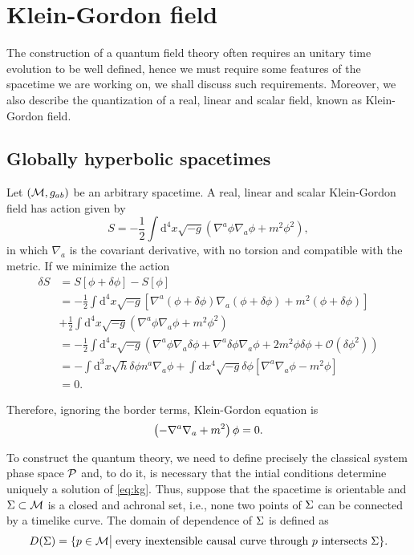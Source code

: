 \chapter{Klein-Gordon field}
\pagestyle{fancy}

The construction of a quantum field theory often requires an unitary time evolution to be well defined, hence we must require some features of the spacetime we are working on, we shall discuss such requirements. Moreover, we also describe the quantization of a real, linear and scalar field, known as Klein-Gordon field.

\section{Globally hyperbolic spacetimes}
Let \(({\mathcal{M}}, g_{ab})\) be an arbitrary spacetime. A real, linear and scalar Klein-Gordon field has action given by
\begin{equation}
    S=-\frac{1}{2}\int\mathrm{d}^4x\sqrt{-g}\left(\nabla^a\phi\nabla_a\phi+m^2\phi^2\right),
\end{equation}
in which \(\nabla_a\) is the covariant derivative, with no torsion and compatible with the metric. If we minimize the action
\begin{subequations}
    \begin{align}
        \delta S&=S[\phi+\delta\phi]-S[\phi]\\
        &=-\frac{1}{2}\int\mathrm{d}^4x\sqrt{-g}\left[\nabla^a(\phi+\delta\phi)\nabla_a(\phi+\delta\phi)+m^2(\phi+\delta\phi)\right]\\
        &+\frac{1}{2}\int\mathrm{d}^4x\sqrt{-g}\left(\nabla^a\phi\nabla_a\phi+m^2\phi^2\right)\\
        &=-\frac{1}{2}\int\mathrm{d}^4x\sqrt{-g}\left(\nabla^a\phi\nabla_a\delta\phi+\nabla^a\delta\phi\nabla_a\phi+2m^2\phi\delta\phi+\mathcal{O}(\delta\phi^2)\right)\\
        &=-\int\mathrm{d}^3x\sqrt{h}\delta\phi n^a\nabla_a\phi+\int\mathrm{d}x^4\sqrt{-g}\delta\phi\left[\nabla^a\nabla_a\phi-m^2\phi\right]\\
        &=0.
    \end{align}
\end{subequations}

Therefore, ignoring the border terms, Klein-Gordon equation is
\begin{equation}\label{eq:kg}
    \left(-\nabla^a\nabla_a+m^2\right)\phi=0.
\end{equation}

To construct the quantum theory, we need to define precisely the classical system phase space \({\mathcal{P}}\) and, to do it, is necessary that the intial conditions determine uniquely a solution of \cref{eq:kg}. Thus, suppose that the spacetime is orientable and \(\Sigma\subset{\mathcal{M}}\) is a closed and achronal set, i.e., none two points of \(\Sigma\) can be connected by a timelike curve. The domain of dependence of \(\Sigma\) is defined as
\begin{equation*}
    D(\Sigma)=\{p\in{\mathcal{M}}\big\vert\;\text{every inextensible causal curve through \(p\) intersects \(\Sigma\)}\}.
\end{equation*}

